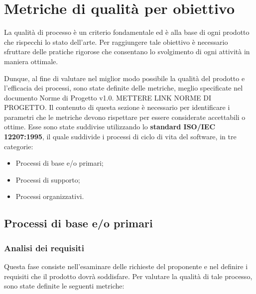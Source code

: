 \section{Metriche di qualità per obiettivo}
La qualità di processo è un criterio fondamentale ed è alla base di ogni prodotto
che rispecchi lo stato dell'arte. Per raggiungere tale obiettivo è necessario
sfruttare delle pratiche rigorose che consentano lo svolgimento di ogni attività
in maniera ottimale.

Dunque, al fine di valutare nel miglior modo possibile la qualità del prodotto e l'efficacia dei processi, sono state definite delle metriche, meglio specificate nel documento Norme di Progetto v1.0. METTERE LINK NORME DI PROGETTO. Il contenuto di
questa sezione è necessario per identificare i parametri che le metriche devono rispettare per essere considerate accettabili o ottime.
Esse sono state suddivise utilizzando lo \textbf{standard ISO/IEC 12207:1995}, il quale suddivide i processi di ciclo di vita del software, in tre categorie:
\begin{itemize}
	\item Processi di base e/o primari;
	\item Processi di supporto;
	\item Processi organizzativi.
\end{itemize}

\subsection{Processi di base e/o primari}
\subsubsection{Analisi dei requisiti}
Questa fase consiste nell'esaminare delle richieste del proponente e nel definire i requisiti che il prodotto dovrà soddisfare. Per valutare la qualità di tale processo, sono state definite le seguenti metriche:


